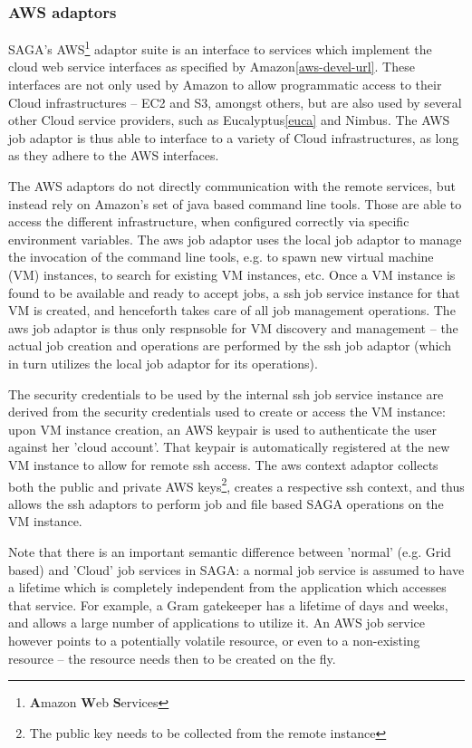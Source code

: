 \documentclass[conference,final]{IEEEtran}
\newcommand{\B}[1]{\textbf{#1}}
\begin{document}
\subsubsection{AWS adaptors}

SAGA's AWS\footnote{\B{A}mazon \B{W}eb \B{S}ervices} adaptor suite is
an interface to services which implement the cloud web service
interfaces as specified by Amazon\ref{aws-devel-url}.  These
interfaces are not only used by Amazon to allow programmatic access to
their Cloud infrastructures -- EC2 and S3, amongst others, but are
also used by several other Cloud service providers, such as
Eucalyptus\ref{euca} and Nimbus.  The AWS job adaptor is thus able to
interface to a variety of Cloud infrastructures, as long as they
adhere to the AWS interfaces.

The AWS adaptors do not directly communication with the remote
services, but instead rely on Amazon's set of java based command line
tools.  Those are able to access the different infrastructure, when
configured correctly via specific environment variables.  The aws job
adaptor uses the local job adaptor to manage the invocation of the
command line tools, e.g. to spawn new virtual machine (VM) instances,
to search for existing VM instances, etc.  Once a VM instance is found
to be available and ready to accept jobs, a ssh job service instance
for that VM is created, and henceforth takes care of all job
management operations.  The aws job adaptor is thus only respnsoble
for VM discovery and management -- the actual job creation and
operations are performed by the ssh job adaptor (which in turn
utilizes the local job adaptor for its operations).

The security credentials to be used by the internal ssh job service
instance are derived from the security credentials used to create or
access the VM instance: upon VM instance creation, an AWS keypair is
used to authenticate the user against her 'cloud account'.  That
keypair is automatically registered at the new VM instance to allow
for remote ssh access.  The aws context adaptor collects both the
public and private AWS keys\footnote{The public key needs to be
  collected from the remote instance}, creates a respective ssh
context, and thus allows the ssh adaptors to perform job and file
based SAGA operations on the VM instance.

Note that there is an important semantic difference between 'normal'
(e.g. Grid based) and 'Cloud' job services in SAGA: a normal job
service is assumed to have a lifetime which is completely independent
from the application which accesses that service.  For example, a Gram
gatekeeper has a lifetime of days and weeks, and allows a large number
of applications to utilize it.  An AWS job service however points to a
potentially volatile resource, or even to a non-existing resource --
the resource needs then to be created on the fly.
\end{document}
